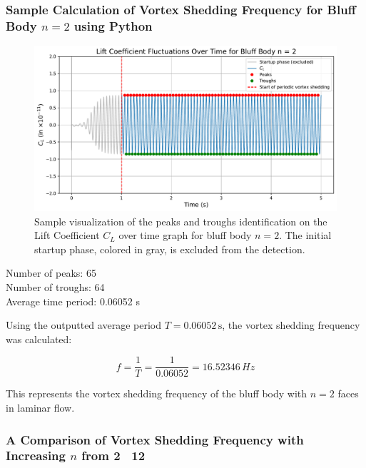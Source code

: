 \subsubsection{Sample Calculation of Vortex Shedding Frequency for Bluff Body $n=2$ using Python}

\begin{figure}[H]
	\centering
	\includegraphics[width=\textwidth]{images/2face_graph_sample_Calc}
	\caption{Sample visualization of the peaks and troughs identification on the Lift Coefficient $C_L$ over time graph for bluff body $n=2$. The initial startup phase, colored in gray, is excluded from the detection.}
	\label{fig:2FaceGraphSampleCalc} 
\end{figure}

\begin{tcolorbox}[title=Python Output,fonttitle=\bfseries,
	colframe=black!75!white,colback=gray!10!white,boxrule=0.5pt,
	fontupper=\ttfamily]
	Number of peaks:    65 \\
	Number of troughs:  64 \\
	
	Average time period: 0.06052 s \\
\end{tcolorbox}

Using the outputted average period \( T = 0.06052 \, \text{s} \), the vortex shedding frequency was calculated:

\[
f = \frac{1}{T} = \frac{1}{0.06052} = 16.52346 \, Hz
\]

This represents the vortex shedding frequency of the bluff body with \( n = 2 \) faces in laminar flow.

\subsubsection{A Comparison of Vortex Shedding Frequency with Increasing $n$ from 2 \textendash\ 12}

